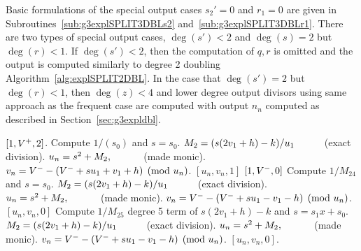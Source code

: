 Basic formulations of the special output cases $s_2' = 0$ and $r_1 = 0$ are
given in Subroutines~\ref{sub:g3explSPLIT3DBLs2}
and~\ref{sub:g3explSPLIT3DBLr1}. There are two types of special output cases,
$\deg(s') < 2$ and $\deg(s) = 2$ but $\deg(r) < 1$. If $\deg(s') < 2$, then the
computation of $q,r$ is omitted and the output is computed similarly to degree 2
doubling Algorithm~\ref{alg:explSPLIT2DBL}.  In the case that $\deg(s') = 2$ but
$\deg(r) < 1$, then $\deg(z) < 4$ and lower degree output divisors using same
approach as the frequent case are computed with output $n_n$ computed as
described in Section~\ref{sec:g3expldbl}.  

\begin{subroutine}[htbp]
\caption{Genus 3 Split Model Degree 3 Doubling ($s_2' = 0$)\label{sub:g3explSPLIT3DBLs2}}
\begin{algorithmic} [1]
     \Return $[1,V^{+},2]$.
    \Else
        \State Compute $1/(s_0)$ and $s = s_0$.
        \State $M_2 = (s(2v_1 + h) - k)/u_1 \quad\quad\quad $(exact division).
        \State $u_n = s^2 + M_2, \quad\quad\quad $ (made monic).
        \State $v_n = V^{-} - (V^{-} + su_1 + v_1 + h) \pmod{u_n}$.
        \State \Return $[u_n,v_n,1]$
    \EndIf
\EndIf
{}
     \Return $[1,V^{-},0]$
    \Else
        \State Compute $1/M_{24}$ and $s = s_0$.
        \State $M_2 = (s(2v_1 + h) - k)/u_1 \quad\quad\quad $(exact division).
        \State $u_n = s^2 + M_2, \quad\quad\quad $ (made monic).
        \State $v_n = V^{-} - (V^{-} + su_1 - v_1 - h) \pmod{u_n}$.
        \State \Return $[u_n,v_n,0]$
    \EndIf
\EndIf
\State Compute $1/M_{25}$ degree 5 term of $s(2v_1 + h) - k$ and $s = s_1x + s_0$.
\State $M_2 = (s(2v_1 + h) - k)/u_1 \quad\quad\quad $(exact division).
\State $u_n = s^2 + M_2, \quad\quad\quad $ (made monic).
\State $v_n = V^{-} - (V^{-} + su_1 - v_1 - h) \pmod{u_n}$.
\State \Return $[u_n,v_n,0]$.
\end{algorithmic}
\end{subroutine}

